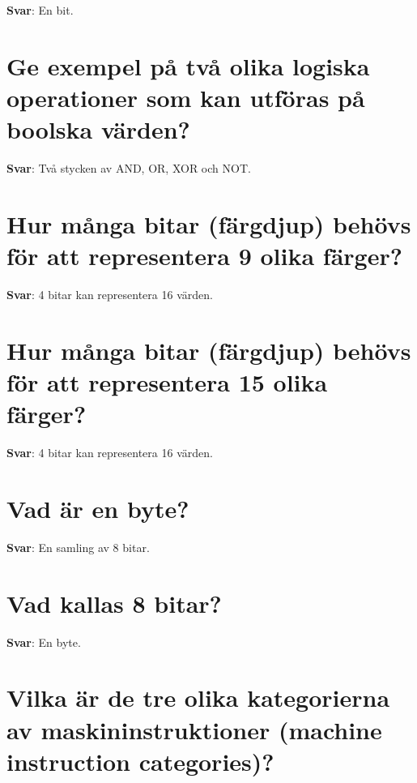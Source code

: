 \documentclass[a4paper,11pt,oneside]{book}
\begin{document}
\begin{sloppypar}
\label{q:87:sa:sv:True}

\textbf{Svar}: En bit.



\section{Ge exempel p\r{a} tv\r{a} olika logiska operationer som kan utf\"oras p\r{a} boolska v\"arden?}

\label{q:88:sa:sv:True}

\textbf{Svar}: Tv\r{a} stycken av AND, OR, XOR och NOT.



\section{Hur m\r{a}nga bitar (f\"argdjup) beh\"ovs f\"or att representera 9 olika f\"arger?}

\label{q:89:sa:sv:True}

\textbf{Svar}: 4 bitar kan representera 16 v\"arden.



\section{Hur m\r{a}nga bitar (f\"argdjup) beh\"ovs f\"or att representera 15 olika f\"arger?}

\label{q:90:sa:sv:True}

\textbf{Svar}: 4 bitar kan representera 16 v\"arden.



\section{Vad \"ar en byte?}

\label{q:91:sa:sv:True}

\textbf{Svar}: En samling av 8 bitar.



\section{Vad kallas 8 bitar?}

\label{q:92:sa:sv:True}

\textbf{Svar}: En byte.



\section{Vilka \"ar de tre olika kategorierna av maskininstruktioner (machine instruction categories)?}


\end{sloppypar}
\end{document}
